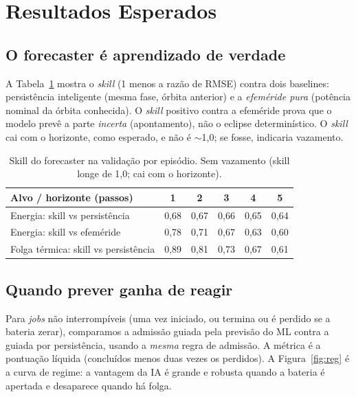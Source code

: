 \documentclass[11pt]{article}
\begin{document}
\section{Resultados Esperados}

\subsection{O forecaster \'e aprendizado de verdade}

A Tabela~\ref{tab:skill} mostra o \emph{skill} (1 menos a raz\~ao de RMSE) contra dois baselines: persist\^encia inteligente (mesma fase, \'orbita anterior) e a \emph{efem\'eride pura} (pot\^encia nominal da \'orbita conhecida). O \emph{skill} positivo contra a efem\'eride prova que o modelo prev\^e a parte \emph{incerta} (apontamento), n\~ao o eclipse determin\'istico. O \emph{skill} cai com o horizonte, como esperado, e n\~ao \'e $\sim$1,0; se fosse, indicaria vazamento.

\begin{table}[h]
\centering
\begin{tabular}{lccccc}
\toprule
Alvo / horizonte (passos) & 1 & 2 & 3 & 4 & 5 \\
\midrule
Energia: skill vs persist\^encia & 0,68 & 0,67 & 0,66 & 0,65 & 0,64 \\
Energia: skill vs efem\'eride    & 0,78 & 0,71 & 0,67 & 0,63 & 0,60 \\
Folga t\'ermica: skill vs persist\^encia & 0,89 & 0,81 & 0,73 & 0,67 & 0,61 \\
\bottomrule
\end{tabular}
\caption{Skill do forecaster na valida\c{c}\~ao por epis\'odio. Sem vazamento (skill longe de 1,0; cai com o horizonte).}
\label{tab:skill}
\end{table}

\subsection{Quando prever ganha de reagir}

Para \emph{jobs} n\~ao interromp\'iveis (uma vez iniciado, ou termina ou \'e perdido se a bateria zerar), comparamos a admiss\~ao guiada pela previs\~ao do ML contra a guiada por persist\^encia, usando a \emph{mesma} regra de admiss\~ao. A m\'etrica \'e a pontua\c{c}\~ao l\'iquida (conclu\'idos menos duas vezes os perdidos). A Figura~\ref{fig:reg} \'e a curva de regime: a vantagem da IA \'e grande e robusta quando a bateria \'e apertada e desaparece quando h\'a folga.
\end{document}

